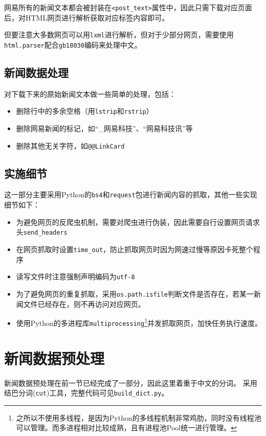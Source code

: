 \documentclass[logo,reportComp]{thesis}
\begin{document}
网易所有的新闻文本都会被封装在\verb'<post_text>'属性中，因此只需下载对应页面后，对HTML网页进行解析获取对应标签内容即可。

但要注意大多数网页可以用\verb'lxml'进行解析，但对于少部分网页，需要使用\verb'html.parser'配合\verb'gb18030'编码来处理中文。

\subsection{新闻数据处理}
对下载下来的原始新闻文本做一些简单的处理，包括：
\begin{itemize}
\item 删除行中的多余空格（用\verb'lstrip'和\verb'rstrip'）
\item 删除网易新闻的标记，如``\_网易科技''、``网易科技讯''等
\item 删除其他无关字符，如\verb'@@LinkCard'
\end{itemize}

\subsection{实施细节}
这一部分主要采用Python的\verb'bs4'和\verb'request'包进行新闻内容的抓取，其他一些实现细节如下：
\begin{itemize}
\item 为避免网页的反爬虫机制，需要对爬虫进行伪装，因此需要自行设置网页请求头\verb'send_headers'
\item 在网页抓取时设置\verb'time_out'，防止抓取网页时因为网速过慢等原因卡死整个程序
\item 读写文件时注意强制声明编码为\verb'utf-8'
\item 为了避免网页的重复抓取，采用\verb'os.path.isfile'判断文件是否存在，若某一新闻文件已经存在，则不再访问对应网页。
\item 使用Python的多进程库\verb'multiprocessing'\footnote{之所以不使用多线程，是因为Python的多线程机制非常鸡肋，同时没有线程池可以管理。而多进程相对比较成熟，且有进程池Pool统一进行管理。}并发抓取网页，加快任务执行速度。
\end{itemize}


\section{新闻数据预处理}

新闻数据预处理在前一节已经完成了一部分，因此这里着重于中文的分词。
采用结巴分词(\verb'cut')工具，完整代码可见\verb'build_dict.py'。
\end{document}

